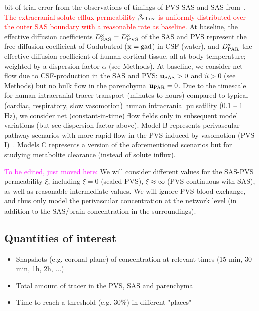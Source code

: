 \documentclass[fleqn,10pt]{wlscirep}
\newcommand{\mer}[1]{\textcolor{magenta}{#1}}
\newcommand{\discuss}[1]{\textcolor{red}{#1}}
\begin{document}
\begin{table}
{{      bit of trial-error from the observations of timings of PVS-SAS
      and SAS from~\cite{eide2024functional}.} \discuss{The extracranial solute efflux permeability $\beta_{\rm efflux}$ is uniformly distributed over the outer SAS boundary with a reasonable rate as baseline\cite{hornkjol2022csf, eide2021clinical, ringstad2024glymphatic}.} At baseline, the effective diffusion coefficients $D^{\rm x}_{\rm SAS} = D^{\rm x}_{\rm PVS}$ of the SAS and PVS represent the free diffusion coefficient of Gadubutrol (${\rm x} = {\rm gad}$) in CSF (water), and $D^{\rm x}_{\rm PAR}$ the effective diffusion coefficient of human cortical tissue, all at body temperature; weighted by a dispersion factor $\alpha$ (see Methods). At baseline, we consider net flow due to CSF-production in the SAS and PVS: $\mathbf{u}_{\rm SAS} > 0$ and $\hat{u} > 0$ (see Methods) but no bulk flow in the parenchyma $\mathbf{u}_{\rm PAR} = 0$. Due to the timescale for human intracranial tracer transport (minutes to hours) compared to typical (cardiac, respiratory, slow vasomotion) human intracranial pulsatility (0.1 -- 1 Hz), we consider net (constant-in-time) flow fields only in subsequent model variations (but see dispersion factor above).
    Model B represents perivascular pathway scenarios with more rapid flow in the PVS induced by vasomotion (PVS I)~\cite{gjerde2023directional}.
    Models C represents a version of the aforementioned scenarios but for studying metabolite clearance (instead of solute influx).}
\label{tab:scenarios}
\end{table}


\mer{To be edited, just moved here:} We will consider different values for the SAS-PVS permeability $\xi$, including $\xi = 0$ (sealed PVS), $\xi \approx \infty$ (PVS continuous with SAS), as well as reasonable intermediate values. We will ignore PVS-blood exchange, and thus only model the perivascular concentration at the network level (in addition to the SAS/brain concentration in the surroundings).  

\subsection*{Quantities of interest}

\begin{itemize}
    \item Snapshots (e.g. coronal plane) of concentration at relevant times (15 min, 30 min, 1h, 2h, ...) 
    \item Total amount of tracer in the PVS, SAS and parenchyma
     \item Time to reach a threshold (e.g. 30\%) in different "places"
\end{itemize}
\end{document}
